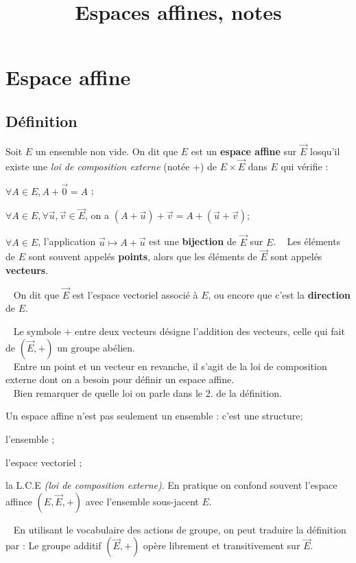 \documentclass{../../tete}
\title{Espaces affines, notes   }
\begin{document}
\maketitle
\section{Espace affine}
\subsection{Définition}
\bd
Soit $E$ un ensemble non vide. 
On dit que $E$ est un \textbf{espace affine} sur $\vec{E}$ losqu'il existe une \textit{loi de composition externe} (notée +) de $E \times \vec{E}$ dans $E$ qui vérifie :
\ben
\item $\forall A \in E, A + \vec{0} = A$ ;
\item $\forall A \in E, \forall \vec{u}, \vec{v} \in \vec{E}$, on a $(A + \vec{u}) + \vec{v} = A + (\vec{u} + \vec{v})$;
\item $\forall A \in E$, l'application $\vec{u} \mapsto A + \vec{u}$ est une \textbf{bijection} de $\vec{E}$ sur $E$.
\een
\ed
\bn
\star ~ Les éléments de $E$ sont souvent appelés \textbf{points}, alors que les éléments de $\vec{E}$ sont appelés \textbf{vecteurs}.

\star ~ On dit que $\vec{E}$ est l'espace vectoriel associé à $E$, ou encore que c'est la \textbf{direction} de $E$.
\en

\bw
\star ~ Le symbole $+$ entre deux vecteurs désigne l'addition des vecteurs, celle qui fait de $(\vec{E}, +)$ un groupe abélien.\\
\star ~ Entre un point et un vecteur en revanche, il s'agit de la loi de composition externe dont on a besoin pour définir un espace affine.\\
 ~ Bien remarquer de quelle loi on parle dans le 2. de la définition.
\ew

\bn
Un espace affine n'est pas seulement un ensemble : c'est une structure; 
\ben
\item l'ensemble ; 
\item l'espace vectoriel ;
\item la L.C.E \textit{(loi de composition externe)}.
\een
\doigt En pratique on confond souvent l'espace affince $(E, \vec{E}, +)$ avec l'ensemble sous-jacent $E$.
\en

\medskip

\noindent \dag ~ En utilisant le vocabulaire des actions de groupe, on peut traduire la définition par : Le groupe additif $(\vec{E}, +)$ opère librement et transitivement sur $\vec{E}$.
\end{document}
